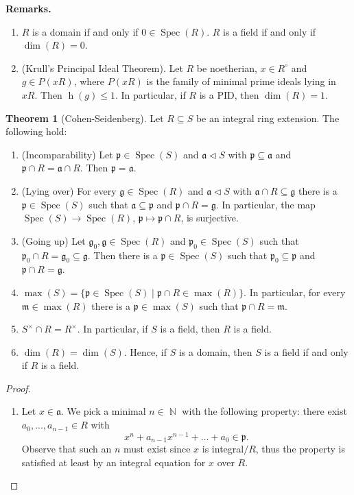\documentclass[12pt,a4paper]{report}
\theoremstyle{definition}
\newtheorem{theorem}{Theorem}[chapter] %
\theoremstyle{num.custom-title}
\DeclareMathOperator{\N}{\mathbb{N}}
\DeclareMathOperator{\sse}{\subseteq}
\DeclareMathOperator{\Spec}{Spec}
\DeclareMathOperator{\h}{h}
\newcommand{\g}{\mathfrak{g}}
\newcommand{\p}{\mathfrak{p}}
\newcommand{\m}{\mathfrak{m}}
\begin{document}
\noindent\textbf{Remarks.}
\begin{enumerate}
\item $R$ is a domain if and only if $0 \in \Spec(R)$. $R$ is a field if and only if $\dim(R)=0$.
\item (Krull's Principal Ideal Theorem). Let $R$ be noetherian, $x \in R^\circ$ and $g \in P(xR)$, where $P(xR)$ is the family of minimal prime ideals lying in $xR$. Then $\h(g) \leq 1$. In particular, if $R$ is a PID, then $\dim(R)=1$.
\end{enumerate}

\begin{theorem}[Cohen-Seidenberg]
Let $R \sse S$ be an integral ring extension. The following hold:
\begin{enumerate}
\item (Incomparability) Let $\p \in \Spec(S)$ and $\mathfrak{a} \lhd S$ with $\p \sse \mathfrak{a}$ and $\p \cap R = \mathfrak{a} \cap R$. Then $\p = \mathfrak{a}$.
\item (Lying over) For every $\g \in \Spec(R)$ and $\mathfrak{a} \lhd S$ with $\mathfrak{a} \cap R \sse \g$ there is a $\p \in \Spec(S)$ such that $\mathfrak{a} \sse \p$ and $\p \cap R = \g$. In particular, the map $\Spec(S) \to \Spec(R)$, $\p \mapsto \p \cap R$, is surjective.
\item (Going up) Let $\g_0, \g \in \Spec(R)$ and $\p_0 \in \Spec(S)$ such that $\p_0 \cap R = \g_0 \sse \g$. Then there is a $\p \in \Spec(S)$ such that $\p_0 \sse \p$ and $\p \cap R = \g$.
\item $\max(S) = \{ \p \in \Spec(S) \mid \p \cap R \in \max(R) \}$. In particular, for every $\m \in \max(R)$ there is a $\p \in \max(S)$ such that $\p \cap R = \m$.
\item $S^\times \cap R = R^\times$. In particular, if $S$ is a field, then $R$ is a field.
\item $\dim(R) = \dim(S)$. Hence, if $S$ is a domain, then $S$ is a field if and only if $R$ is a field.
\end{enumerate}
\begin{proof}\ 
\begin{enumerate}
\item Let $x \in \mathfrak{a}$. We pick a minimal $n \in \N$ with the following property: there exist $a_0,...,a_{n-1} \in R$ with
\[
x^n + a_{n-1}x^{n-1} + \ldots + a_0 \in \p.
\]
Observe that such an $n$ must exist since $x$ is integral$/R$, thus the property is satisfied at least by an integral equation for $x$ over $R$.\\

\end{enumerate}
\end{proof}
\end{theorem}
\end{document}
